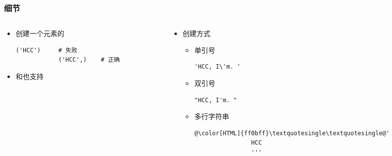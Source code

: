 \begin{CJK}{UTF8}{gbsn}
\begin{frame} [fragile]
	\frametitle{细节}
	\linespread{1.25}
	\begin{columns}[T]
		\begin{column}[T]{.5\textwidth}
			\begin{itemize}
			\item 创建一个元素的 
			\begin{lstlisting}[style=pythonstyle, gobble=12, texcl]
			('HCC')		# 失败
			('HCC',)	# 正确
			\end{lstlisting}
			\item {}和也支持
			\end{itemize}
		\end{column}
		\begin{column}[T]{.5\textwidth}
			\begin{itemize}
			\item {}创建方式
				\begin{itemize}
				\item 单引号
				\begin{lstlisting}[style=pythonstyle, gobble=16, texcl]
				'HCC, I\'m. '
				\end{lstlisting}
				\end{itemize}
				\begin{itemize}
				\item 双引号
				\begin{lstlisting}[style=pythonstyle, gobble=16, texcl]
				"HCC, I'm. "
				\end{lstlisting}
				\end{itemize}
				\begin{itemize}
				\item 多行字符串
				\begin{lstlisting}[style=pythonstyle, gobble=16, escapechar=@]
				@\color[HTML]{ff0bff}\textquotesingle\textquotesingle@'
				HCC
				'''
				\end{lstlisting}
				\end{itemize}
			\end{itemize}
		\end{column}
	\end{columns}
\end{frame}


\end{CJK}
